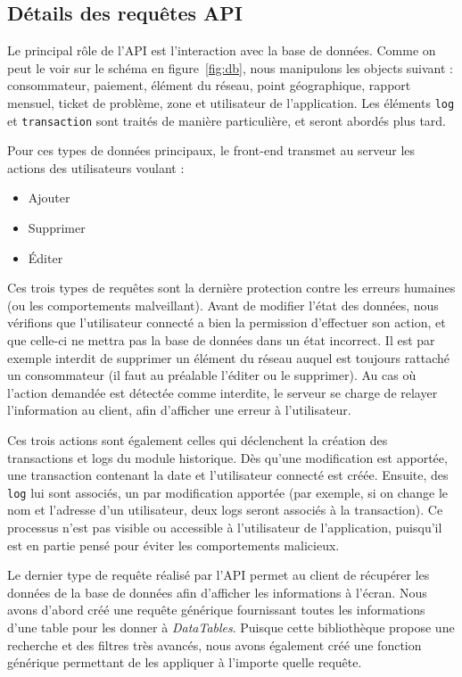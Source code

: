 \documentclass{EPL-master-thesis-covers-FR}
\begin{document}
			\subsection*{Détails des requêtes API}
				\label{sec:api}
				Le principal rôle de l'API est l'interaction avec la base de données. Comme on peut le voir sur le schéma en figure~\ref{fig:db}, nous manipulons les objects suivant : consommateur, paiement, élément du réseau, point géographique, rapport mensuel, ticket de problème, zone et utilisateur de l'application. Les éléments \texttt{log} et \texttt{transaction} sont traités de manière particulière, et seront abordés plus tard.

				Pour ces types de données principaux, le front-end transmet au serveur les actions des utilisateurs voulant : 
				\begin{itemize}
					\item Ajouter
					\item Supprimer
					\item \'Editer
				\end{itemize}

				Ces trois types de requêtes sont la dernière protection contre les erreurs humaines (ou les comportements malveillant). Avant de modifier l'état des données, nous vérifions que l'utilisateur connecté a bien la permission d'effectuer son action, et que celle-ci ne mettra pas la base de données dans un état incorrect. Il est par exemple interdit de supprimer un élément du réseau auquel est toujours rattaché un consommateur (il faut au préalable l'éditer ou le supprimer). Au cas où l'action demandée est détectée comme interdite, le serveur se charge de relayer l'information au client, afin d'afficher une erreur à l'utilisateur.

				Ces trois actions sont également celles qui déclenchent la création des transactions et logs du module historique. Dès qu'une modification est apportée, une transaction contenant la date et l'utilisateur connecté est créée. Ensuite, des \texttt{log} lui sont associés, un par modification apportée (par exemple, si on change le nom et l'adresse d'un utilisateur, deux logs seront associés à la transaction). Ce processus n'est pas visible ou accessible à l'utilisateur de l'application, puisqu'il est en partie pensé pour éviter les comportements malicieux.

				Le dernier type de requête réalisé par l'API permet au client de récupérer les données de la base de données afin d'afficher les informations à l'écran. Nous avons d'abord créé une requête générique fournissant toutes les informations d'une table pour les donner à \emph{DataTables}. Puisque cette bibliothèque propose une recherche et des filtres très avancés, nous avons également créé une fonction générique permettant de les appliquer à l'importe quelle requête. 
\end{document}
